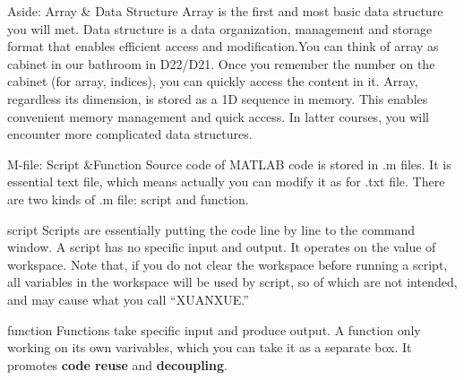 \begin{frame}
\begin{block}{Aside: Array \& Data Structure\footnotemark}
Array is the first and most basic data structure you will met. Data structure is a data organization, management and storage format that enables efficient access and modification.\footnotemark You can think of array as cabinet in our bathroom in D22/D21. Once you remember the number on the cabinet (for array, indices), you can quickly access the content in it. Array, regardless its dimension, is stored as a 1D sequence in memory. This enables convenient memory management and quick access. In latter courses, you will encounter more complicated data structures. 
\end{block}
\end{frame}

\begin{frame}{M-file: Script \&Function}
Source code of MATLAB code is stored in .m files. It is essential text file, which means actually you can modify it as for .txt file. There are two kinds of .m file: script and function.
\begin{block}{script}
Scripts are essentially putting the code line by line to the command window. A script has no specific input and output. It operates on the value of workspace. Note that, if you do not clear the workspace before running a script, all variables in the workspace will be used by script, so of which are not intended, and may cause what you call ``XUANXUE.'' \footnotemark
\end{block}
\begin{block}{function}
Functions take specific input and produce output. A function only working on its own varivables, which you can take it as a separate box. It promotes \textbf{code reuse} and \textbf{decoupling}.
\end{block}
\end{frame}

